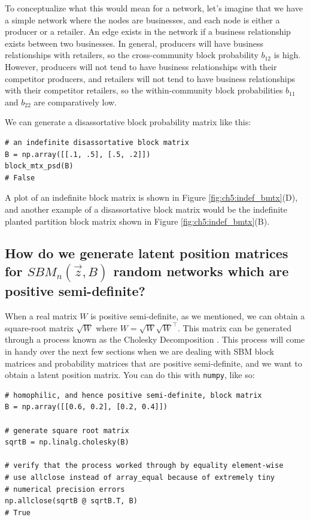 To conceptualize what this would mean for a network, let's imagine that we have a simple network where the nodes are businesses, and each node is either a producer or a retailer. An edge exists in the network if a business relationship exists between two businesses. In general, producers will have business relationships with retailers, so the cross-community block probability $b_{12}$ is high. However, producers will not tend to have business relationships with their competitor producers, and retailers will not tend to have business relationships with their competitor retailers, so the within-community block probabilities $b_{11}$ and $b_{22}$ are comparatively low.

We can generate a disassortative block probability matrix like this:
\begin{lstlisting}[style=python]
# an indefinite disassortative block matrix
B = np.array([[.1, .5], [.5, .2]])
block_mtx_psd(B)
# False
\end{lstlisting}

A plot of an indefinite block matrix is shown in Figure \ref{fig:ch5:indef_bmtx}(D), and another example of a disassortative block matrix would be the indefinite planted partition block matrix shown in Figure \ref{fig:ch5:indef_bmtx}(B).

\subsection{How do we generate latent position matrices for $SBM_n(\vec z, B)$ random networks which are positive semi-definite?}
\label{sec:ch5:psd_block:lpm_fromsbm}
When a real matrix $W$ is positive semi-definite, as we mentioned, we can obtain a square-root matrix $\sqrt W$ where $W = \sqrt{W}\sqrt{W}^\top$. This matrix can be generated through a process known as the {Cholesky Decomposition} \cite{Horn2012Oct}. This process will come in handy over the next few sections when we are dealing with SBM block matrices and probability matrices that are positive semi-definite, and we want to obtain a latent position matrix. You can do this with \texttt{numpy}, like so:

\begin{lstlisting}[style=python]
# homophilic, and hence positive semi-definite, block matrix
B = np.array([[0.6, 0.2], [0.2, 0.4]])

# generate square root matrix
sqrtB = np.linalg.cholesky(B)

# verify that the process worked through by equality element-wise
# use allclose instead of array_equal because of extremely tiny
# numerical precision errors
np.allclose(sqrtB @ sqrtB.T, B)
# True
\end{lstlisting}

